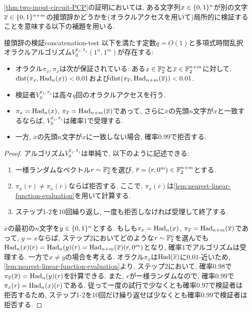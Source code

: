 \cref{thm:two-input-circuit-PCP}の証明においては, ある文字列$x\in\{0,1\}^n$が別の文字$\overline{x}\in\{0,1\}^{n+m}$の接頭辞かどうかを(オラクルアクセスを用いて)局所的に検証することを意味する以下の補題を用いる.
\begin{lemma}{接頭辞の検証}{concatenation-test}
  以下を満たす定数$q=O(1)$と多項式時間乱択オラクルアルゴリズム$V_0^{\pi_x,\pi_{\overline{x}}}(1^n,1^m)$が存在する:
  \begin{itemize}
    \item オラクル$\pi_x,\pi_{\overline{x}}$は次が保証されている: ある$x\in\mathbb{F}_2^n$と$\overline{x}\in\mathbb{F}_2^{n+m}$に対して, $\mathrm{dist}(\pi_x,\mathrm{Had}_n(x))<0.01$および$\mathrm{dist}(\pi_{\overline{x}},\mathrm{Had}_{n+m}(\overline{x}))<0.01$.
    \item 検証者$V_0^{\pi_x,\pi_{\overline{x}}}$は高々$q$回のオラクルアクセスを行う.
    \item $\pi_x = \mathrm{Had}_n(x)$, $\pi_{\overline{x}}=\mathrm{Had}_{n+m}(\overline{x})$であって, さらに$\overline{x}$の先頭$n$文字が$x$と一致するならば, $V_0^{\pi_x,\pi_{\overline{x}}}$は確率$1$で受理する.
    \item 一方, $\overline{x}$の先頭$n$文字が$x$に一致しない場合, 確率$0.99$で拒否する.
  \end{itemize}
\end{lemma}
\begin{proof}
  アルゴリズム$V_0^{\pi_x,\pi_{\overline{x}}}$は単純で, 以下のように記述できる:
  \begin{enumerate}
    \item 一様ランダムなベクトル$r\sim\mathbb{F}_2^n$を選び, $\overline{r}=(r,0^m)\in\mathbb{F}_2^{n+m}$とする.
    \item $\pi_x(r) \ne \pi_{\overline{x}}(\overline{r})$ならば拒否する. ここで, $\pi_{\overline{x}}(\overline{r})$は\cref{lem:nearest-linear-function-evaluation}を用いて計算する.
    \item ステップ1-2を10回繰り返し, 一度も拒否しなければ受理して終了する.
  \end{enumerate}

  $\overline{x}$の最初の$n$文字を$y\in\{0,1\}^n$とする.
  もしも$\pi_x=\mathrm{Had}_n(x)$, $\pi_{\overline{x}}=\mathrm{Had}_{n+m}(\overline{x})$であって, $y=x$ならば, ステップ2においてどのような$r\sim\mathbb{F}_2^n$を選んでも$\mathrm{Had}_n(x)(r) = \mathrm{Had}_n(y)(r) = \mathrm{Had}_{n+m}(\overline{x})(r,0^m)$となり, 確率$1$でアルゴリズムは受理する.
  一方で$x\ne y$の場合を考える. オラクル$\pi_{\overline{x}}$は$\mathrm{Had}(\overline{x})$に$0.01$-近いため,
  \cref{lem:nearest-linear-function-evaluation}より, ステップ2において, 確率$0.98$で$\pi_{\overline{x}}(\overline{x})=\mathrm{Had}_n(y)(r)$を計算できる. また, $r$が一様ランダムなので, 確率$0.99$で$\pi_x(r)=\mathrm{Had}_n(x)(r)$である.
  従って一度の試行で少なくとも確率$0.97$で検証者は拒否するため,
  ステップ1-2を10回だけ繰り返せば少なくとも確率$0.99$で検証者は拒否する.
\end{proof}

